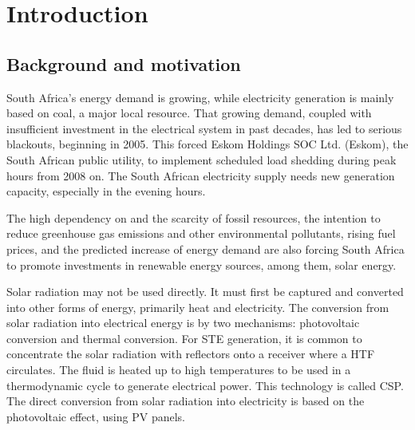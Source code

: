 \chapter{Introduction}
\section{Background and motivation}

South Africa's energy demand is growing, while electricity generation is mainly based on coal, a major local resource. That growing demand, coupled with insufficient investment in the electrical system in past decades, has led to serious blackouts, beginning in 2005. This forced Eskom Holdings SOC Ltd. (Eskom), the South African public utility, to implement scheduled load shedding during peak hours from 2008 on. The South African electricity supply needs new generation capacity, especially in the evening hours. 


The high dependency on and the scarcity of fossil resources, the intention to reduce greenhouse gas emissions and other environmental pollutants, rising fuel prices, and the predicted increase of energy demand are also forcing South Africa to promote investments in renewable energy sources, among them, solar energy.

Solar radiation may not be used directly. It must first be captured and converted into other forms of energy, primarily heat and electricity. The conversion from solar radiation into electrical energy is by two mechanisms: photovoltaic conversion and thermal conversion. For \ac{STE} generation, it is common to concentrate the solar radiation with reflectors onto a receiver where a \ac{HTF} circulates. The fluid is heated up to high temperatures to be used in a thermodynamic cycle to generate electrical power. This technology is called \ac{CSP}. The direct conversion from solar radiation into electricity is based on the photovoltaic effect, using \ac{PV} panels. 

